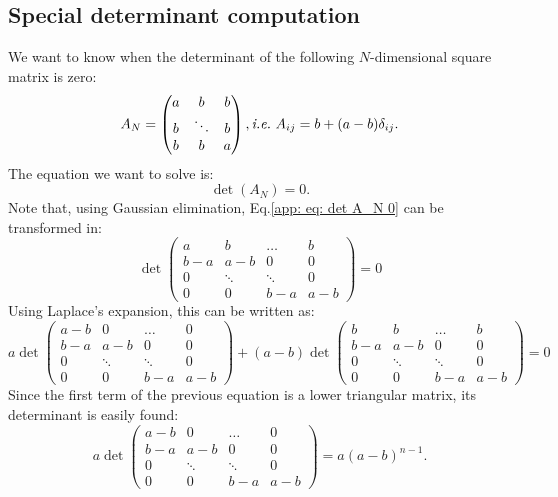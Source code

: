 \documentclass[12pt]{report}
\begin{document}
\subsection{Special determinant computation}\label{app : special determinant computation}
We want to know when the determinant of the following $N$-dimensional square matrix is zero:
\begin{equation}
A_N = \begin{pmatrix}
a & b & b  \\
b & \ddots & b  \\
b & b & a
\end{pmatrix}, \textit{i.e.} \ A_{ij} = b+(a-b)\delta_{ij}.
\end{equation}
The equation we want to solve is:
\begin{equation}
\det\left(A_N\right)=0. \label{app: eq: det A_N 0}
\end{equation}
Note that, using Gaussian elimination, Eq.\eqref{app: eq: det A_N 0} can be transformed in:
\begin{equation}
\det\begin{pmatrix}
a & b & \dots & b \\
b-a & a-b & 0 & 0 \\
0 & \ddots & \ddots & 0 \\
0 & 0 & b-a & a-b
\end{pmatrix}=0
\end{equation}
Using Laplace's expansion, this can be written as:
\begin{equation}
 a \det\begin{pmatrix}
a-b & 0 & \dots & 0 \\
b-a & a-b & 0 & 0 \\
0 & \ddots & \ddots & 0 \\
0 & 0 & b-a & a-b
\end{pmatrix}+(a-b)
\det\begin{pmatrix}
b & b & \dots & b \\
b-a & a-b & 0 & 0 \\
0 & \ddots & \ddots & 0 \\
0 & 0 & b-a & a-b
\end{pmatrix}=0 \label{app: eq: laplace expansion}
\end{equation}
Since the first term of the previous equation is a lower triangular matrix, its determinant is easily found:
\begin{equation}
a \det\begin{pmatrix}
a-b & 0 & \dots & 0 \\
b-a & a-b & 0 & 0 \\
0 & \ddots & \ddots & 0 \\
0 & 0 & b-a & a-b
\end{pmatrix} = a\left(a-b\right)^{n-1}.
\end{equation}
\end{document}
